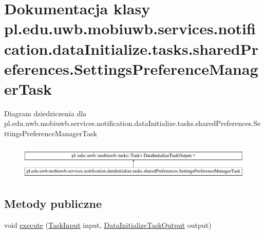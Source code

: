 \hypertarget{classpl_1_1edu_1_1uwb_1_1mobiuwb_1_1services_1_1notification_1_1data_initialize_1_1tasks_1_1sharfea0e1fb4d2269185de585e411b5e8b3}{}\section{Dokumentacja klasy pl.\+edu.\+uwb.\+mobiuwb.\+services.\+notification.\+data\+Initialize.\+tasks.\+shared\+Preferences.\+Settings\+Preference\+Manager\+Task}
\label{classpl_1_1edu_1_1uwb_1_1mobiuwb_1_1services_1_1notification_1_1data_initialize_1_1tasks_1_1sharfea0e1fb4d2269185de585e411b5e8b3}
Diagram dziedziczenia dla pl.\+edu.\+uwb.\+mobiuwb.\+services.\+notification.\+data\+Initialize.\+tasks.\+shared\+Preferences.\+Settings\+Preference\+Manager\+Task\begin{figure}[H]
\begin{center}
\leavevmode
\includegraphics[height=1.699545cm]{classpl_1_1edu_1_1uwb_1_1mobiuwb_1_1services_1_1notification_1_1data_initialize_1_1tasks_1_1sharfea0e1fb4d2269185de585e411b5e8b3}
\end{center}
\end{figure}
\subsection*{Metody publiczne}
\begin{DoxyCompactItemize}
\item 
void \hyperlink{classpl_1_1edu_1_1uwb_1_1mobiuwb_1_1services_1_1notification_1_1data_initialize_1_1tasks_1_1sharfea0e1fb4d2269185de585e411b5e8b3_aadd06cdab6556991272c607078a54daf}{execute} (\hyperlink{classpl_1_1edu_1_1uwb_1_1mobiuwb_1_1tasks_1_1models_1_1_task_input}{Task\+Input} input, \hyperlink{classpl_1_1edu_1_1uwb_1_1mobiuwb_1_1services_1_1notification_1_1data_initialize_1_1_data_initialize_task_output}{Data\+Initialize\+Task\+Output} output)
\end{DoxyCompactItemize}
